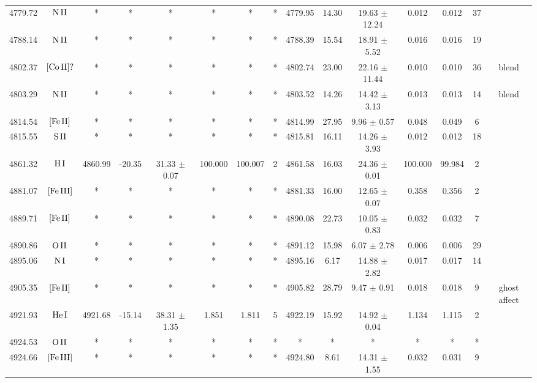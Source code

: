 \documentclass{article}
\begin{document}
\begin{table*}
\begin{adjustbox}{width=\textwidth}
\begin{tabular}{ccccccccccccccc}
4779.72 & $\mbox{N}\thinspace \mbox{II}$ & * & * & * & * & * & * & 4779.95 & 14.30 & 19.63 $\pm$ 12.24 & 0.012 & 0.012 & 37 &  \\
4788.14 & $\mbox{N}\thinspace \mbox{II}$ & * & * & * & * & * & * & 4788.39 & 15.54 & 18.91 $\pm$ 5.52 & 0.016 & 0.016 & 19 &  \\
4802.37 & $\mbox{[Co}\thinspace \mbox{II]?}$ & * & * & * & * & * & * & 4802.74 & 23.00 & 22.16 $\pm$ 11.44 & 0.010 & 0.010 & 36 &  blend \\
4803.29 & $\mbox{N}\thinspace \mbox{II}$ & * & * & * & * & * & * & 4803.52 & 14.26 & 14.42 $\pm$ 3.13 & 0.013 & 0.013 & 14 &  blend \\
4814.54 & $\mbox{[Fe}\thinspace \mbox{II]}$ & * & * & * & * & * & * & 4814.99 & 27.95 & 9.96 $\pm$ 0.57 & 0.048 & 0.049 & 6 &  \\
4815.55 & $\mbox{S}\thinspace \mbox{II}$ & * & * & * & * & * & * & 4815.81 & 16.11 & 14.26 $\pm$ 3.93 & 0.012 & 0.012 & 18 &  \\
4861.32 & $\mbox{H}\thinspace \mbox{I}$ & 4860.99 & -20.35 & 31.33 $\pm$ 0.07 & 100.000 & 100.007 & 2 & 4861.58 & 16.03 & 24.36 $\pm$ 0.01 & 100.000 & 99.984 & 2 &  \\
4881.07 & $\mbox{[Fe}\thinspace \mbox{III]}$ & * & * & * & * & * & * & 4881.33 & 16.00 & 12.65 $\pm$ 0.07 & 0.358 & 0.356 & 2 &  \\
4889.71 & $\mbox{[Fe}\thinspace \mbox{II]}$ & * & * & * & * & * & * & 4890.08 & 22.73 & 10.05 $\pm$ 0.83 & 0.032 & 0.032 & 7 &  \\
4890.86 & $\mbox{O}\thinspace \mbox{II}$ & * & * & * & * & * & * & 4891.12 & 15.98 & 6.07 $\pm$ 2.78 & 0.006 & 0.006 & 29 &  \\
4895.06 & $\mbox{N}\thinspace \mbox{I}$ & * & * & * & * & * & * & 4895.16 & 6.17 & 14.88 $\pm$ 2.82 & 0.017 & 0.017 & 14 &  \\
4905.35 & $\mbox{[Fe}\thinspace \mbox{II]}$ & * & * & * & * & * & * & 4905.82 & 28.79 & 9.47 $\pm$ 0.91 & 0.018 & 0.018 & 9 &  ghost affect \\
4921.93 & $\mbox{He}\thinspace \mbox{I}$ & 4921.68 & -15.14 & 38.31 $\pm$ 1.35 & 1.851 & 1.811 & 5 & 4922.19 & 15.92 & 14.92 $\pm$ 0.04 & 1.134 & 1.115 & 2 &  \\
4924.53 & $\mbox{O}\thinspace \mbox{II}$ & * & * & * & * & * & * & * & * & * & * & * & * &  \\
4924.66 & $\mbox{[Fe}\thinspace \mbox{III]}$ & * & * & * & * & * & * & 4924.80 & 8.61 & 14.31 $\pm$ 1.55 & 0.032 & 0.031 & 9 &  \\

\end{tabular}
\end{adjustbox}
\end{table*}
\end{document}
